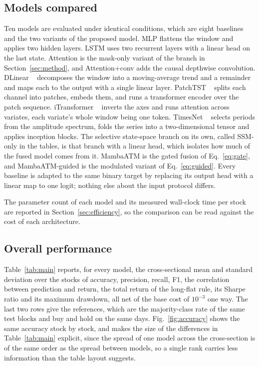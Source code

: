 \documentclass[pdflatex,sn-mathphys-ay]{sn-jnl}
\theoremstyle{thmstyleone}%
\theoremstyle{thmstyletwo}%
\theoremstyle{thmstyletwo}%
\begin{document}
\begin{table}[tbp]
	\centering
	\caption{The panel. Rows are removed inside the pipeline rather than in the panel files, so the released panel is exactly what was retrieved and screened.}
	\label{tab:panel}
	
\end{table}

\subsection{Models compared}

Ten models are evaluated under identical conditions, which are eight baselines and the two variants
of the proposed model. MLP flattens the window and applies
two hidden layers. LSTM uses two recurrent layers with a linear head on the last state. Attention is
the mask-only variant of the branch in Section~\ref{sec:method}, and Attention+conv adds the causal
depthwise convolution. DLinear ~\citep{zeng2023dlinear} decomposes the window into a moving-average
trend and a remainder and maps each to the output with a single linear layer. PatchTST
~\citep{nie2023patchtst} splits each channel into patches, embeds them, and runs a transformer
encoder over the patch sequence. iTransformer ~\citep{liu2024itransformer} inverts the axes and runs
attention across variates, each variate's whole window being one token. TimesNet
~\citep{wu2023timesnet} selects periods from the amplitude spectrum, folds the series into a
two-dimensional tensor and applies inception blocks. The selective state-space branch on its own,
called SSM-only in the tables, is that branch with a linear head, which isolates how much of the
fused model comes from it. MambaATM is
the gated fusion of Eq.~\eqref{eq:gate}, and MambaATM-guided is the modulated variant of
Eq.~\eqref{eq:guided}. Every baseline is adapted to the same binary target by replacing its output
head with a linear map to one logit; nothing else about the input protocol differs.

The parameter count of each model and its measured wall-clock time per stock are reported in
Section~\ref{sec:efficiency}, so the comparison can be read against the cost of each architecture.

\subsection{Overall performance}

Table~\ref{tab:main} reports, for every model, the cross-sectional mean and standard deviation over
the \nStocks{} stocks of accuracy, precision, recall, F1, the correlation between prediction and
return, the total return of the long-flat rule, its Sharpe ratio and its maximum drawdown, all net
of the base cost of $10^{-3}$ one way. The last two rows give the references, which are the
majority-class rate of the same test blocks and buy and hold on the same days. Fig.~\ref{fig:accuracy}
shows the same accuracy stock by stock, and makes the size of the differences in Table~\ref{tab:main}
explicit, since the spread of one model across the cross-section is of the same order as the spread
between models, so a single rank carries less information than the table layout suggests.
\end{document}
